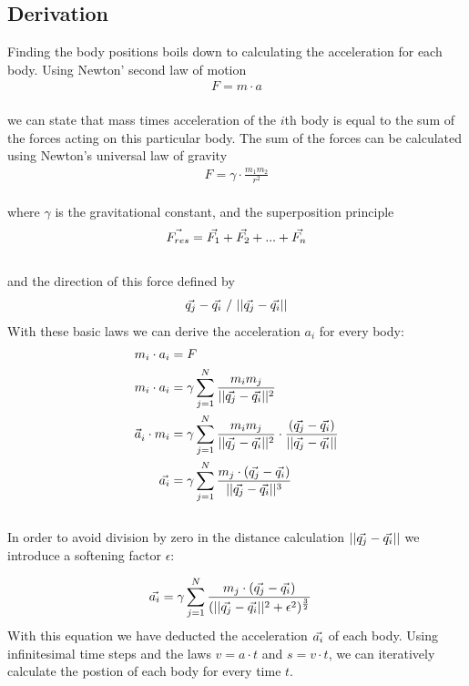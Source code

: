 \documentclass[a4paper,11pt]{scrartcl} %
\newcommand*{\vv}[1]{\vec{\mkern0mu#1}}
\begin{document}
\subsection{Derivation}
Finding the body positions boils down to calculating the acceleration for each body. Using Newton' second law of motion
\begin{align*}
F = m \cdot a
\end{align*}\\
we can state that mass times acceleration of the $i$th body is equal to the sum of the forces acting on this particular body. The sum of the forces can be calculated using Newton's universal law of gravity
\begin{align*}
F = \gamma \cdot \frac{m_1m_2}{r^2}
\end{align*}\\
where $\gamma$ is the gravitational constant, and the superposition principle
\begin{align*}
\vv{F_{res}} = \vv{F_1} + \vv{F_2} + ... + \vv{F_n}
\end{align*}\\
and the direction of this force defined by
\begin{align*}
\vv{q_j} -\vv{q_i}~/~||\vv{q_j} - \vv{q_i}||
\end{align*}
With these basic laws we can derive the acceleration $a_i$ for every body:
\begin{align*}
	m_i \cdot a_i &= F\\
	m_i \cdot a_i &= \gamma \sum\limits_{j=1}^N \frac{m_i m_j}{||\vv{q_j} - \vv{q_i}||^2}  \\
	\vec{a}^{\,}_i \cdot m_i &= \gamma \sum\limits_{j=1}^N \frac{m_i m_j}{||\vv{q_j} - \vv{q_i}||^2} \cdot \frac{(\vv{q_j} - \vv{q_i})}{||\vv{q_j} - \vv{q_i}||} \\
	\vv{a_i} &= \gamma \sum\limits_{j=1}^N \frac{m_j \cdot (\vv{q_j} - \vv{q_i})}{||\vv{q_j} - \vv{q_i}||^3}
\end{align*}\\
In order to avoid division by zero in the distance calculation $||\vv{q_j} - \vv{q_i}||$ we introduce a softening factor $\epsilon$:

\begin{align*}
	\vv{a_i} &= \gamma \sum\limits_{j=1}^N \frac{m_j \cdot (\vv{q_j} - \vv{q_i})}{(||\vv{q_j} - \vv{q_i}||^2 + \epsilon^2)^\frac{3}{2}}
\end{align*}
With this equation we have deducted the acceleration $\vv{a_i}$ of each body. Using infinitesimal time steps and the laws $v = a\cdot t$ and $s=v\cdot t$, we can iteratively calculate the postion of each body for every time $t$.
\end{document}
